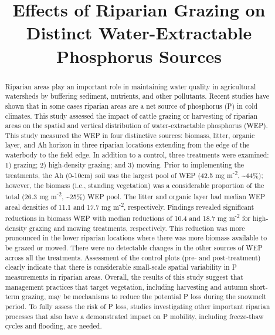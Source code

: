 \documentclass[
]{agujournal2019}
\begin{document}
\title{Effects of Riparian Grazing on Distinct Water-Extractable
Phosphorus Sources}



\begin{abstract}
Riparian areas play an important role in maintaining water quality in
agricultural watersheds by buffering sediment, nutrients, and other
pollutants. Recent studies have shown that in some cases riparian areas
are a net source of phosphorus (P) in cold climates. This study assessed
the impact of cattle grazing or harvesting of riparian areas on the
spatial and vertical distribution of water-extractable phosphorus (WEP).
This study measured the WEP in four distinctive sources: biomass,
litter, organic layer, and Ah horizon in three riparian locations
extending from the edge of the waterbody to the field edge. In addition
to a control, three treatments were examined: 1) grazing; 2)
high-density grazing; and 3) mowing. Prior to implementing the
treatments, the Ah (0-10cm) soil was the largest pool of WEP (42.5 mg
m\textsuperscript{-2}, \textasciitilde44\%); however, the biomass (i.e.,
standing vegetation) was a considerable proportion of the total (26.3 mg
m\textsuperscript{-2}, \textasciitilde25\%) WEP pool. The litter and
organic layer had median WEP areal densities of 11.1 and 17.7 mg
m\textsuperscript{-2}, respectively. Findings revealed significant
reductions in biomass WEP with median reductions of 10.4 and 18.7 mg
m\textsuperscript{-2} for high-density grazing and mowing treatments,
respectively. This reduction was more pronounced in the lower riparian
locations where there was more biomass available to be grazed or mowed.
There were no detectable changes in the other sources of WEP across all
the treatments. Assessment of the control plots (pre- and
post-treatment) clearly indicate that there is considerable small-scale
spatial variability in P measurements in riparian areas. Overall, the
results of this study suggest that management practices that target
vegetation, including harvesting and autumn short-term grazing, may be
mechanisms to reduce the potential P loss during the snowmelt period. To
fully assess the risk of P loss, studies investigating other important
riparian processes that also have a demonstrated impact on P mobility,
including freeze-thaw cycles and flooding, are needed.
\end{abstract}
\end{document}
